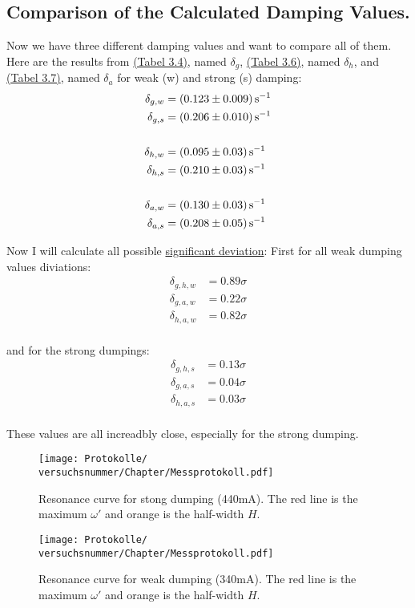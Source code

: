 \subsection*{Comparison of the Calculated Damping Values.}
Now we have three different damping values and want to compare all of them. Here are the results from \hyperref[tab:combined_results]{(Tabel 3.4)}, named $\delta_g$, \hyperref[tab:res_halfw]{(Tabel 3.6)}, named $\delta_h$, and \hyperref[tab:res_amp]{(Tabel 3.7)}, named $\delta_a$ for weak (w) and strong (s) damping:
\begin{align}
    \delta_{g,w} &= (0.123 \pm 0.009)\,\text{s}^{-1} \\
    \delta_{g,s} &= (0.206 \pm 0.010)\,\text{s}^{-1} \\
    \notag \\
    \delta_{h,w} &= (0.095 \pm 0.03)\,\text{s}^{-1} \\
    \delta_{h,s} &= (0.210 \pm 0.03)\,\text{s}^{-1} \\
    \notag \\
    \delta_{a,w} &= (0.130 \pm 0.03)\,\text{s}^{-1} \\
    \delta_{a,s} &= (0.208 \pm 0.05)\,\text{s}^{-1}
\end{align}

Now I will calculate all possible \hyperref[eq:signifikante_abweichung]{significant deviation}:
First for all weak dumping values diviations:
\begin{align}
    \delta_{g,h, w} &= 0.89\sigma\\
    \delta_{g,a, w} &= 0.22\sigma\\
    \delta_{h,a, w} &= 0.82\sigma\\
\end{align}

and for the strong dumpings:
\begin{align}
    \delta_{g,h, s} &= 0.13\sigma\\
    \delta_{g,a, s} &= 0.04\sigma\\
    \delta_{h,a, s} &= 0.03\sigma\\
\end{align}

These values are all increadbly close, especially for the strong dumping.

\onecolumn
\begin{figure}
    \centering
    \texttt{[image: Protokolle/\\versuchsnummer/Chapter/Messprotokoll.pdf]}
    \caption{Resonance curve for stong dumping (440mA). The red line is the maximum $\omega'$ and orange is the half-width $H$.}
    \label{fig:curve_strong}
\end{figure}

\begin{figure}
    \centering
    \texttt{[image: Protokolle/\\versuchsnummer/Chapter/Messprotokoll.pdf]}
    \caption{Resonance curve for weak dumping (340mA). The red line is the maximum $\omega'$ and orange is the half-width $H$.}
    \label{fig:curve_weak}
\end{figure}
\twocolumn
